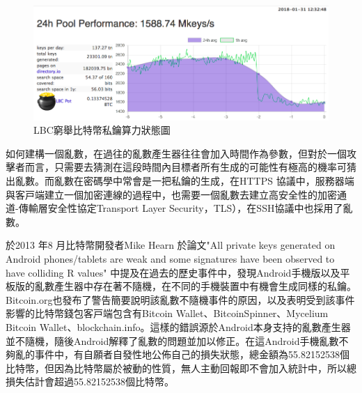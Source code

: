				\begin{figure}[!htbp]
					\centering
					\includegraphics[width = .9\textwidth]{LBC.png}
					\caption{LBC窮舉比特幣私鑰算力狀態圖\supercite{TheLargeBitcoinCollider}}\label{LBC}
				\end{figure}

				如何建構一個亂數，在過往的亂數產生器往往會加入時間作為參數，但對於一個攻擊者而言，只需要去猜測在這段時間內目標者所有生成的可能性有極高的機率可猜出亂數。而亂數在密碼學中常會是一把私鑰的生成，在HTTPS 協議中，服務器端與客⼾端建⽴⼀個加密連線的過程中，也需要⼀個亂數去建⽴⾼安全性的加密通道-傳輸層安全性協定Transport Layer Security，TLS）\supercite{dierks2008transport}，在SSH協議\supercite{ThesecureshellSSHprotocolarchitecture}中也採用了亂數。
		
				於2013 年8 ⽉⽐特幣開發者Mike Hearn 於論文"All private keys generated on Android phones/tablets are weak and some signatures have been observed to have colliding R values" \supercite{SomeSecureRandomThoughts}中提及在過去的歷史事件中，發現Android手機版以及平板版的亂數產生器中存在著不隨機，在不同的手機裝置中有機會生成同樣的私鑰。Bitcoin.org也發布了警告\supercite{AndroidSecurityVulnerability}簡要說明該亂數不隨機事件的原因，以及表明受到該事件影響的⽐特幣錢包客⼾端包含有Bitcoin Wallet、BitcoinSpinner、Mycelium Bitcoin Wallet、blockchain.info。這樣的錯誤源於Android本身支持的亂數產生器並不隨機，隨後Android解釋了亂數的問題並加以修正。在這Android手機亂數不夠亂的事件中，有自願者自發性地公佈自己的損失狀態，總金額為55.82152538個比特幣\supercite{Badsignaturesleading}，但因為比特幣屬於被動的性質，無人主動回報即不會加入統計中，所以總損失估計會超過55.82152538個比特幣。

